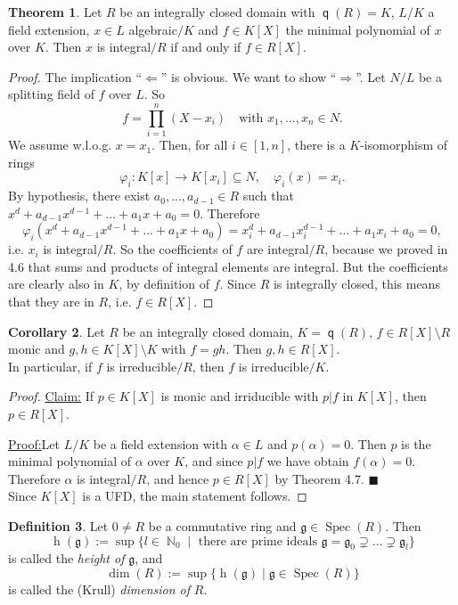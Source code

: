 \documentclass[12pt,a4paper]{report}
\theoremstyle{definition}
\newtheorem{theorem}{Theorem}[chapter] %
\newtheorem{corollary}[theorem]{Corollary} %
\newtheorem{defn}[theorem]{Definition}
\theoremstyle{num.custom-title}
\newenvironment{claim}[1]{\par\noindent\underline{Claim#1:}\space}{} %
\newenvironment{claimproof}[1]{\par\noindent\underline{Proof:}\space#1}{\leavevmode\unskip\penalty9999 \hbox{}\nobreak\hfill\quad\hbox{$\blacksquare$}} %
\DeclareMathOperator{\N}{\mathbb{N}}
\DeclareMathOperator{\imp}{\Rightarrow}
\DeclareMathOperator{\pmi}{\Leftarrow}
\DeclareMathOperator{\sm}{\setminus}
\DeclareMathOperator{\sse}{\subseteq}
\DeclareMathOperator{\Spec}{Spec}
\DeclareMathOperator{\q}{\mathsf{q}}
\DeclareMathOperator{\h}{h}
\newcommand{\g}{\mathfrak{g}}
\renewcommand{\phi}{\varphi}
\begin{document}
\begin{theorem}\label{thm-min_poly_int_el}
Let $R$ be an integrally closed domain with $\q(R)=K$, $L/K$ a field extension, $x \in L$ algebraic$/K$ and $f \in K[X]$ the minimal polynomial of $x$ over $K$. Then $x$ is integral$/R$ if and only if $f \in R[X]$.
\begin{proof}
The implication ``$\pmi$'' is obvious. We want to show ``$\imp$''. Let $N/L$ be a splitting field of $f$ over $L$. So
\[
f = \prod_{i=1}^n (X-x_i) \quad \text{with } x_1,...,x_n \in N.
\]
We assume w.l.o.g. $x=x_1$. Then, for all $i \in [1,n]$, there is a $K$-isomorphism of rings
\[
\phi_i : K[x] \to K[x_i] \sse N, \quad \phi_i(x) = x_i.
\]
By hypothesis, there exist $a_0,...,a_{d-1} \in R$ such that $x^d+a_{d-1}x^{d-1} + \ldots + a_1 x + a_0 = 0$. Therefore
\[
\phi_i(x^d+a_{d-1}x^{d-1} + \ldots + a_1 x + a_0) = x_i^d+a_{d-1}x_i^{d-1} + \ldots + a_1 x_i + a_0 = 0,
\]
i.e. $x_i$ is integral$/R$. So the coefficients of $f$ are integral$/R$, because we proved in 4.6 that sums and products of integral elements are integral. But the coefficients are clearly also in $K$, by definition of $f$. Since $R$ is integrally closed, this means that they are in $R$, i.e. $f \in R[X]$.
\end{proof}
\end{theorem}

\begin{corollary}
Let $R$ be an integrally closed domain, $K = \q(R)$, $f \in R[X] \sm R$ monic and $g,h \in K[X] \sm K$ with $f=gh$. Then $g,h \in R[X]$.\\
In particular, if $f$ is irreducible$/R$, then $f$ is irreducible$/K$.
\begin{proof}
\begin{claim}{}
If $p \in K[X]$ is monic and irriducible with $p|f$ in $K[X]$, then $p \in R[X]$.
\begin{claimproof}
Let $L/K$ be a field extension with $\alpha \in L$ and $p(\alpha)=0$. Then $p$ is the minimal polynomial of $\alpha$ over $K$, and since $p|f$ we have obtain $f(\alpha)=0$. Therefore $\alpha$ is integral$/R$, and hence $p \in R[X]$ by Theorem 4.7.
\end{claimproof}\\
Since $K[X]$ is a UFD, the main statement follows.
\end{claim}
\end{proof}
\end{corollary}

\begin{defn}
Let $0 \neq R$ be a commutative ring and $\g \in \Spec(R)$. Then
\[
\h(\g) := \sup\{l \in \N_0 \mid \text{ there are prime ideals } \g = \g_0 \supsetneq \ldots \supsetneq \g_l \}
\]
is called the \emph{height of} $\g$, and
\[
\dim(R) := \sup\{ \h(\g) \mid \g \in \Spec(R)\}
\]
is called the (Krull) \emph{dimension of} $R$.
\end{defn}
\end{document}
